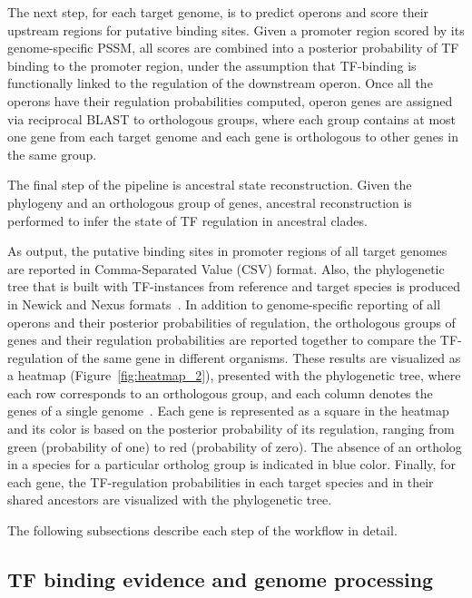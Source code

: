 The next step, for each target genome, is to predict operons and score their
upstream regions for putative binding sites. Given a promoter region scored by
its genome-specific PSSM, all scores are combined into a posterior probability
of TF binding to the promoter region, under the assumption that TF-binding is
functionally linked to the regulation of the downstream operon. Once all the
operons have their regulation probabilities computed, operon genes are assigned
via reciprocal BLAST to orthologous groups, where each group contains at most
one gene from each target genome and each gene is orthologous to other genes in
the same group.

The final step of the pipeline is ancestral state reconstruction. Given the
phylogeny and an orthologous group of genes,  ancestral reconstruction is
performed to infer the state of TF regulation in ancestral clades.

As output, the putative binding sites in promoter regions of all target genomes
are reported in Comma-Separated Value (CSV) format. Also, the phylogenetic tree
that is built with TF-instances from reference and target species is produced
in Newick and Nexus formats~\citep{maddison1997nexus,
  felsenstein2004inferring}. In addition to genome-specific reporting of all
operons and their posterior probabilities of regulation, the orthologous groups
of genes and their regulation probabilities are reported together to compare
the TF-regulation of the same gene in different organisms. These results are
visualized as a heatmap (Figure~\ref{fig:heatmap_2}), presented with the
phylogenetic tree, where each row corresponds to an orthologous group, and each
column denotes the genes of a single genome~\citep{huerta2016ete}. Each gene is
represented as a square in the heatmap and its color is based on the posterior
probability of its regulation, ranging from green (probability of one) to red
(probability of zero). The absence of an ortholog in a species for a particular
ortholog group is indicated in blue color. Finally, for each gene, the
TF-regulation probabilities in each target species and in their shared ancestors are
visualized with the phylogenetic tree.

The following subsections describe each step of the workflow in detail.

\subsection{TF binding evidence and genome processing}


